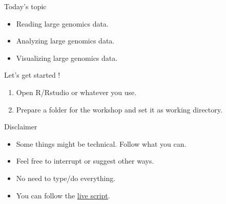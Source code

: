 \documentclass[10pt]{beamer}
\begin{document}
\begin{frame}{Today's topic}
  \begin{block}{}
    \begin{itemize}
    \item Reading large genomics data.
    \item Analyzing large genomics data.
    \item Visualizing large genomics data.
    \end{itemize}
  \end{block}

  \begin{block}{Let's get started !}
    \begin{enumerate}
    \item Open R/Rstudio or whatever you use.
    \item Prepare a folder for the workshop and set it as working directory.
    \end{enumerate}
  \end{block}

  \begin{alertblock}{Disclaimer}
    \begin{itemize}
    \item Some things might be technical. Follow what you can.
    \item Feel free to interrupt or suggest other ways.
    \item No need to type/do everything.
    \item You can follow the \href{https://www.dropbox.com/s/j28rhx2zj7sjvfj/liveScript.txt?dl=0}{live script}.
    \end{itemize}
  \end{alertblock}


\end{frame}
\end{document}
